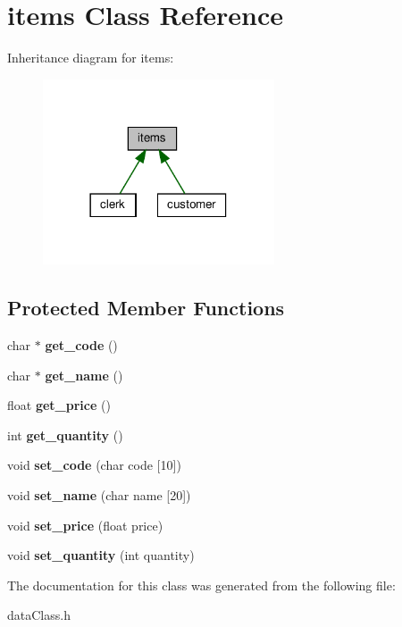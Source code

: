 \hypertarget{classitems}{}\section{items Class Reference}
\label{classitems}


Inheritance diagram for items\+:
\nopagebreak
\begin{figure}[H]
\begin{center}
\leavevmode
\includegraphics[width=194pt]{classitems__inherit__graph}
\end{center}
\end{figure}
\subsection*{Protected Member Functions}
\begin{DoxyCompactItemize}
\item 
\mbox{\label{classitems_a5a7a41e23b095e6096a35454bcb9e6a3}} 
char $\ast$ {\bfseries get\+\_\+code} ()
\item 
\mbox{\label{classitems_a252aac1b45b345e02bdc2dc867641d1c}} 
char $\ast$ {\bfseries get\+\_\+name} ()
\item 
\mbox{\label{classitems_a2dbb4878dd1ea7d30bef82e1c25870b8}} 
float {\bfseries get\+\_\+price} ()
\item 
\mbox{\label{classitems_a822e6944c69cff121784f37ae8fc3e53}} 
int {\bfseries get\+\_\+quantity} ()
\item 
\mbox{\label{classitems_a247847d28799c6f17e3118928c0ea3e1}} 
void {\bfseries set\+\_\+code} (char code \mbox{[}10\mbox{]})
\item 
\mbox{\label{classitems_a01669ca13ce82885df1579138cfb43a9}} 
void {\bfseries set\+\_\+name} (char name \mbox{[}20\mbox{]})
\item 
\mbox{\label{classitems_aee8fbfc6e786eb09f0817607500c8718}} 
void {\bfseries set\+\_\+price} (float price)
\item 
\mbox{\label{classitems_a7e750c133d6fe0dac52eb7995f9214ed}} 
void {\bfseries set\+\_\+quantity} (int quantity)
\end{DoxyCompactItemize}


The documentation for this class was generated from the following file\+:\begin{DoxyCompactItemize}
\item 
data\+Class.\+h\end{DoxyCompactItemize}
